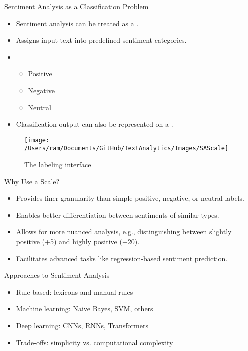 \begin{frame}{Sentiment Analysis as a Classification Problem}
    \begin{itemize}
        \item Sentiment analysis can be treated as a    .
        \item Assigns input text into predefined sentiment categories.
        \item [] 
        \begin{itemize}
            \item Positive
            \item Negative
            \item Neutral
        \end{itemize}
        \item Classification output can also be represented on a .
    \end{itemize}
    \begin{figure}
    \centering
    \texttt{[image: /Users/ram/Documents/GitHub/TextAnalytics/Images/SAScale]}
    \caption{The labeling interface}
    \label{fig:sascale}
    \end{figure}


\end{frame}

\begin{frame}{Why Use a Scale?}
    \begin{itemize}
        \item Provides finer granularity than simple positive, negative, or neutral labels.
        \item Enables better differentiation between sentiments of similar types.
        \item Allows for more nuanced analysis, e.g., distinguishing between slightly positive (+5) and highly positive (+20).
        \item Facilitates advanced tasks like regression-based sentiment prediction.
    \end{itemize}
\end{frame}

\begin{frame}{Approaches to Sentiment Analysis}
    \begin{itemize}
        \item Rule-based: lexicons and manual rules
        \item Machine learning: Naive Bayes, SVM, others
        \item Deep learning: CNNs, RNNs, Transformers
        \item Trade-offs: simplicity vs. computational complexity
    \end{itemize}
\end{frame}


